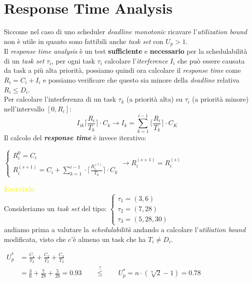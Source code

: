 \section{Response Time Analysis}
Siccome nel caso di uno scheduler \textit{deadline monotonic} ricavare l'\textit{utilization bound} non è utile in quanto sono fattibili anche \textit{task set} con $U_p > 1$. \\
Il \textit{response time analysis} è un test \textbf{sufficiente} e \textbf{necessario} per la schedulabilità di un \textit{task set} $\tau_i$, per ogni task $\tau_i$ calcolare l'\textit{iterference} $I_i$ che può essere causata da task a più alta priorità, possiamo quindi ora calcolare il \textit{response time} come $R_i = C_i + I_i$ e possiamo verificare che questo sia minore della \textit{deadline} relativa $R_i \leq D_i$. \\
Per calcolare l'interferenza di un task $\tau_k$ (a priorità alta) su $\tau_i$ (a priorità minore) nell'intervallo $[0, R_i]$: \[ I_{ik} \lceil \frac{R_i}{T_k} \rceil \cdot C_k \rightarrow I_k = \sum_{k=1}^{i-1} \lceil \frac{R_i}{T_k} \rceil \cdot C_K \]
Il calcolo del \textbf{\textit{response time}} è invece iterativo:
\begin{center}
    \begin{math}
        \begin{cases}
            R_i^0 = C_i \\
            R_i^{(s+1)} = C_i + \sum_{k=1}^{i-1} \cdot \lceil \frac{R_i^{(s)}}{T_k} \rceil \cdot C_k
        \end{cases}
        \rightarrow R_i^{(s+1)} = R_i^{(s)}
    \end{math}
\end{center}
\newpage
\textcolor{yellow}{\textbf{Esercizio}} \\
Consideriamo un \textit{task set} del tipo:
\begin{math}
    \begin{cases}
        \tau_1 = (3, 6) \\
        \tau_2 = (7, 28) \\
        \tau_3 = (5, 28, 30)
    \end{cases}
\end{math} \\ \newline
andiamo prima a valutare la \textit{schedulabilità} andando a calcolare l'\textit{utiliation bound} modificata, visto che c'è almeno un task che ha $T_i \neq D_i$.
\begin{center}
    \begin{math}
        \begin{aligned}
            U_p^* &= \frac{C_1}{T_2} + \frac{C_2}{T_2} + \frac{C_3}{T_3} \\
            &= \frac{3}{6} + \frac{7}{28} + \frac{5}{28} = 0.93 \qquad \stackrel{\text{?}}{\leq} \qquad U_p^* = n \cdot (\sqrt[n]2 - 1) = 0.78\\
        \end{aligned}
    \end{math}
\end{center}
